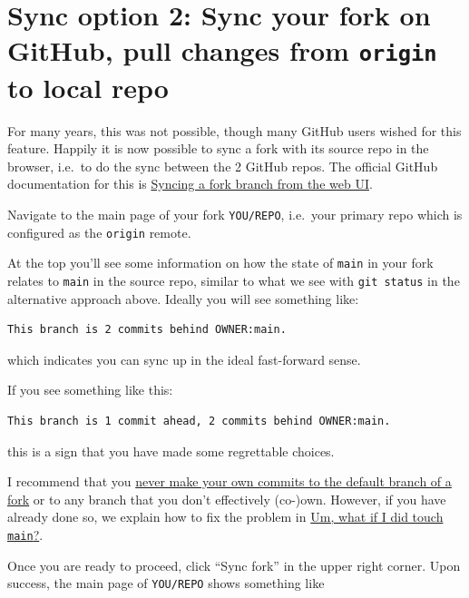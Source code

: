 \documentclass[
]{book}
\begin{document}
\section{\texorpdfstring{Sync option 2: Sync your fork on GitHub, pull changes from \texttt{origin} to local repo}{Sync option 2: Sync your fork on GitHub, pull changes from origin to local repo}}\label{sync-option-2-sync-your-fork-on-github-pull-changes-from-origin-to-local-repo}

For many years, this was not possible, though many GitHub users wished for this feature.
Happily it is now possible to sync a fork with its source repo in the browser, i.e.~to do the sync between the 2 GitHub repos.
The official GitHub documentation for this is \href{https://docs.github.com/en/pull-requests/collaborating-with-pull-requests/working-with-forks/syncing-a-fork\#syncing-a-fork-branch-from-the-web-ui}{Syncing a fork branch from the web UI}.

Navigate to the main page of your fork \texttt{YOU/REPO}, i.e.~your primary repo which is configured as the \texttt{origin} remote.

At the top you'll see some information on how the state of \texttt{main} in your fork relates to \texttt{main} in the source repo, similar to what we see with \texttt{git\ status} in the alternative approach above.
Ideally you will see something like:

\begin{verbatim}
This branch is 2 commits behind OWNER:main.
\end{verbatim}

which indicates you can sync up in the ideal fast-forward sense.

If you see something like this:

\begin{verbatim}
This branch is 1 commit ahead, 2 commits behind OWNER:main.
\end{verbatim}

this is a sign that you have made some regrettable choices.

I recommend that you \hyperref[fork-dont-touch-main]{never make your own commits to the default branch of a fork} or to any branch that you don't effectively (co-)own.
However, if you have already done so, we explain how to fix the problem in \hyperref[touched-main]{Um, what if I did touch \texttt{main}?}.

Once you are ready to proceed, click ``Sync fork'' in the upper right corner.
Upon success, the main page of \texttt{YOU/REPO} shows something like
\end{document}
